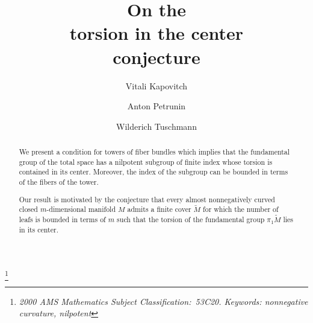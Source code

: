 \documentclass{amsart}
\begin{document}
\title[On the torsion in the center conjecture]{On the\\ torsion in the center\\ conjecture} %
\thanks{\it 2000 AMS Mathematics Subject Classification:\rm\
53C20. Keywords: nonnegative curvature, nilpotent}\rm
\author{Vitali Kapovitch}
\address{Vitali Kapovitch\\Department of Mathematics\\University of Toronto\\
Toronto, Ontario, M5S 2E4, Canada.}\email{vtk@math.toronto.edu}
\author{Anton Petrunin }\address{Anton Petrunin\\ Department of Mathematics\\ Pennsylvania State University\\
University Park, State College, PA 16802, USA.
}
\author{Wilderich Tuschmann}\address{Wilderich Tuschmann
\\Arbeitsgruppe Differentialgeometrie
\\Institut f\"ur Algebra und Geometrie
\\Fakult\"at f\"ur Mathematik
\\Karlsruher Institut f\"ur Technologie
\\Englerstr. 2
\\D-76131 Karlsruhe, Deutschland.}

\begin{abstract}
We present a condition for towers of fiber bundles which implies that the fundamental group of 
the total space has a nilpotent subgroup of finite index whose torsion is contained in its center.
Moreover, the index of the subgroup can be bounded in terms of the fibers of the tower.

Our result is motivated by the conjecture that
every almost nonnegatively curved closed $m$-dimensional manifold $M$ 
admits a finite cover $\tilde M$ for which the number of leafs is bounded in terms of $m$
such that the torsion of the fundamental group $\pi_1 \tilde M$ lies in its center.
\end{abstract}

\maketitle
\end{document}
